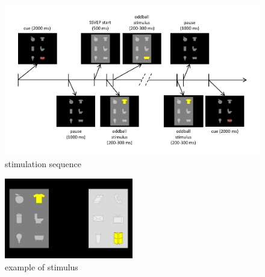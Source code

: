 
\clearpage

%
\begin{figure}[t]
\centering
\includegraphics{pix/stimulationSequence2}
\caption{stimulation sequence}
\label{fig:stimSeq}
\end{figure}

%
\begin{figure}[t]
\centering
\includegraphics[width=0.5\textwidth]{pix/img0000332}
\caption{example of stimulus}
\label{fig:stim2oddball}
\end{figure}

